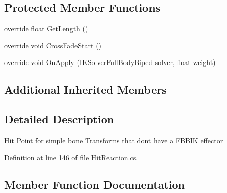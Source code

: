 \subsection*{Protected Member Functions}
\begin{DoxyCompactItemize}
\item 
override float \mbox{\hyperlink{class_root_motion_1_1_final_i_k_1_1_hit_reaction_1_1_hit_point_bone_acc4a766ebf59fa88c1fadba20d014ca9}{Get\+Length}} ()
\item 
override void \mbox{\hyperlink{class_root_motion_1_1_final_i_k_1_1_hit_reaction_1_1_hit_point_bone_a79f92bdd069dd8caa24157e857fce3e1}{Cross\+Fade\+Start}} ()
\item 
override void \mbox{\hyperlink{class_root_motion_1_1_final_i_k_1_1_hit_reaction_1_1_hit_point_bone_a4a966ad4690bc493d1caa9abbb036724}{On\+Apply}} (\mbox{\hyperlink{class_root_motion_1_1_final_i_k_1_1_i_k_solver_full_body_biped}{I\+K\+Solver\+Full\+Body\+Biped}} solver, float \mbox{\hyperlink{class_root_motion_1_1_final_i_k_1_1_offset_modifier_a3a2cd2134e8a197e6a77b48fcf9aa5d4}{weight}})
\end{DoxyCompactItemize}
\subsection*{Additional Inherited Members}


\subsection{Detailed Description}
Hit Point for simple bone Transforms that don\textquotesingle{}t have a F\+B\+B\+IK effector 



Definition at line 146 of file Hit\+Reaction.\+cs.



\subsection{Member Function Documentation}
\mbox{\label{class_root_motion_1_1_final_i_k_1_1_hit_reaction_1_1_hit_point_bone_a79f92bdd069dd8caa24157e857fce3e1}} 
